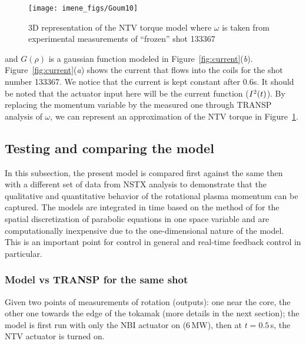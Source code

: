 \documentclass[12pt]{iopart}
\begin{document}
\begin{figure}
\centering
\texttt{[image: imene\_figs/Goum10]} %
\caption{3D representation  of the NTV torque model where $\omega$ is taken from experimental measurements of ``frozen'' shot 133367}
\label{TNTV3D}
\end{figure}

and $G(\rho)$ is a gaussian function modeled in Figure~{\ref{fig:current}}(\emph{b}). Figure~{\ref{fig:current}}(\emph{a}) shows the current that flows into the coils for the shot number 133367. We notice that the current is kept constant after $0.6$s. It should be noted that the actuator input here will be the current function (${I^2}\textrm(t)$). 
By replacing the momentum variable by the measured one through TRANSP analysis of $\omega$, we can represent an approximation of the NTV torque in Figure~\ref{TNTV3D}.

\subsection{Testing and comparing the model}

In this subsection, the present model is compared first against the same then with a different set of data from NSTX analysis to demonstrate that the qualitative and quantitative behavior of the rotational plasma momentum can be captured.  The models are integrated in time based on the method of \cite{Skeel90} for  the spatial discretization of parabolic equations in one space variable and are computationally inexpensive due to the one-dimensional nature of the model.  This is an important point for control in general and real-time feedback control in particular. 
\subsubsection{Model vs TRANSP for the same shot}
Given two points of measurements of rotation (outputs): one near the core, the other one towards the edge of the tokamak (more details in the next section); the model is first run with only the NBI actuator on ($6$\,MW), then at $t=0.5$\,s, the NTV actuator is turned on. 
\end{document}
